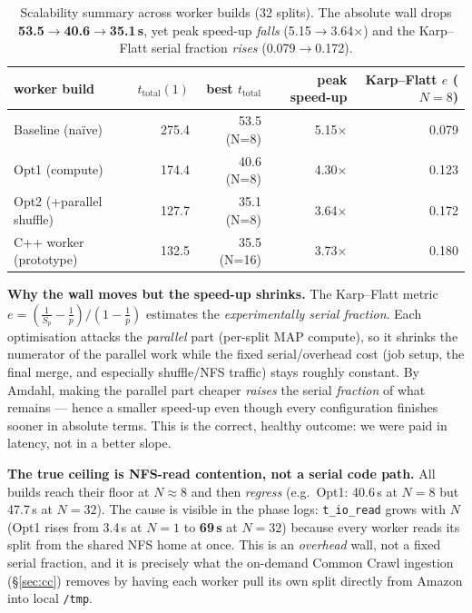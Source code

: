 \documentclass[11pt,a4paper]{article}
\newcommand{\code}[1]{\texttt{\small #1}}
\begin{document}
\begin{table}[H]
\centering
\small
\renewcommand{\arraystretch}{1.2}
\begin{tabular}{@{}lrrrr@{}}
\toprule
worker build & $t_{\text{total}}(1)$ & best $t_{\text{total}}$ & peak speed-up & Karp--Flatt $e$ ($N{=}8$)\\
\midrule
Baseline (na\"ive)      & 275.4 & 53.5 (N=8)  & 5.15$\times$ & 0.079\\
Opt1 (compute)          & 174.4 & 40.6 (N=8)  & 4.30$\times$ & 0.123\\
Opt2 (+parallel shuffle)& 127.7 & 35.1 (N=8)  & 3.64$\times$ & 0.172\\
C++ worker (prototype)  & 132.5 & 35.5 (N=16) & 3.73$\times$ & 0.180\\
\bottomrule
\end{tabular}
\caption{Scalability summary across worker builds (32 splits). The absolute wall
drops \textbf{53.5$\to$40.6$\to$35.1\,s}, yet peak speed-up \emph{falls}
(5.15$\to$3.64$\times$) and the Karp--Flatt serial fraction \emph{rises}
(0.079$\to$0.172).}
\end{table}

\textbf{Why the wall moves but the speed-up shrinks.} The Karp--Flatt metric
$e = \left(\tfrac{1}{S_p}-\tfrac{1}{p}\right)\big/\left(1-\tfrac{1}{p}\right)$
estimates the \emph{experimentally serial fraction}. Each optimisation attacks
the \emph{parallel} part (per-split MAP compute), so it shrinks the numerator of
the parallel work while the fixed serial/overhead cost (job setup, the final
merge, and especially shuffle/NFS traffic) stays roughly constant. By Amdahl,
making the parallel part cheaper \emph{raises} the serial \emph{fraction} of what
remains --- hence a smaller speed-up even though every configuration finishes
sooner in absolute terms. This is the correct, healthy outcome: we were paid in
latency, not in a better slope.

\textbf{The true ceiling is NFS-read contention, not a serial code path.} All
builds reach their floor at $N{\approx}8$ and then \emph{regress} (e.g.\ Opt1:
40.6\,s at $N{=}8$ but 47.7\,s at $N{=}32$). The cause is visible in the phase
logs: \code{t\_io\_read} grows with $N$ (Opt1 rises from 3.4\,s at $N{=}1$ to
\textbf{69\,s} at $N{=}32$) because every worker reads its split from the shared
NFS home at once. This is an \emph{overhead} wall, not a fixed serial fraction,
and it is precisely what the on-demand Common Crawl ingestion
(\S\ref{sec:cc}) removes by having each worker pull its own split directly from
Amazon into local \code{/tmp}.
\end{document}
